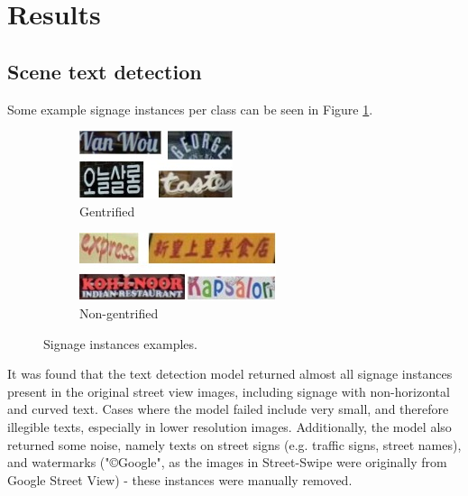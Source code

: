 \section{Results}
\label{sec:results}

\subsection{Scene text detection}
\label{subsec:result1}
Some example signage instances per class can be seen in Figure \ref{fig:instance_ex}.

{
\setlength\intextsep{7pt}
\begin{figure}[H]
\centering
\begin{subfigure}[b]{0.2\textwidth}
    \includegraphics[width=\textwidth]{media/results/instances/instance_gen.jpg}
    \caption{Gentrified}
\end{subfigure}
\quad
\begin{subfigure}[b]{0.22\textwidth}
    \includegraphics[width=\textwidth]{media/results/instances/instance_non.jpg}
    \caption{Non-gentrified}
\end{subfigure}
\caption{Signage instances examples.}
\label{fig:instance_ex}
\end{figure}
}

It was found that the text detection model returned almost all signage instances present in the original street view images, including signage with non-horizontal and curved text. Cases where the model failed include very small, and therefore illegible texts, especially in lower resolution images. Additionally, the model also returned some noise, namely texts on street signs (e.g. traffic signs, street names), and watermarks ("©Google", as the images in Street-Swipe were originally from Google Street View) - these instances were manually removed.


